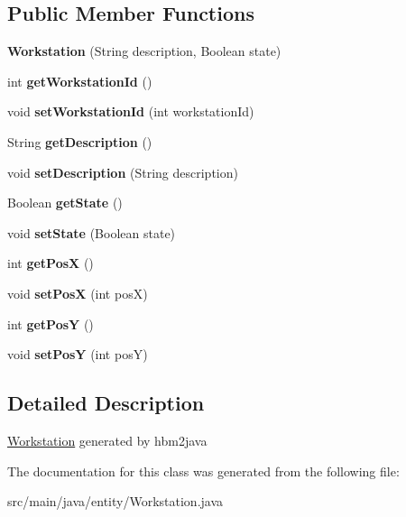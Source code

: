 \subsection*{Public Member Functions}
\begin{DoxyCompactItemize}
\item 
\mbox{\label{classentity_1_1_workstation_a7050f3be8e0ac1b55b66d9dd7d289a0a}} 
{\bfseries Workstation} (String description, Boolean state)
\item 
\mbox{\label{classentity_1_1_workstation_abb73425f42c9c651fdd58e06e9dd5e8b}} 
int {\bfseries get\+Workstation\+Id} ()
\item 
\mbox{\label{classentity_1_1_workstation_a34dbc056f3a0bfa3a94aebfc8a0f0d68}} 
void {\bfseries set\+Workstation\+Id} (int workstation\+Id)
\item 
\mbox{\label{classentity_1_1_workstation_ae79cd9019eb03d8526727c98ade26905}} 
String {\bfseries get\+Description} ()
\item 
\mbox{\label{classentity_1_1_workstation_ad164f196f2a925758dac0e9b9e28484b}} 
void {\bfseries set\+Description} (String description)
\item 
\mbox{\label{classentity_1_1_workstation_a49be3c2bef3d42a5596844c603712061}} 
Boolean {\bfseries get\+State} ()
\item 
\mbox{\label{classentity_1_1_workstation_a33d712bc34bd23dcf56492d3dd562635}} 
void {\bfseries set\+State} (Boolean state)
\item 
\mbox{\label{classentity_1_1_workstation_a43d6a5ccbe7769f8601c1ca0cd71ab93}} 
int {\bfseries get\+PosX} ()
\item 
\mbox{\label{classentity_1_1_workstation_a8cf2d5ff53a3904c985ad3cd7a8604a7}} 
void {\bfseries set\+PosX} (int posX)
\item 
\mbox{\label{classentity_1_1_workstation_a503cd702ed0e333b2a45460f9e4e8d1f}} 
int {\bfseries get\+PosY} ()
\item 
\mbox{\label{classentity_1_1_workstation_a94cb1fa4f96761a1b495b6f3fc8439da}} 
void {\bfseries set\+PosY} (int posY)
\end{DoxyCompactItemize}


\subsection{Detailed Description}
\mbox{\hyperlink{classentity_1_1_workstation}{Workstation}} generated by hbm2java 

The documentation for this class was generated from the following file\+:\begin{DoxyCompactItemize}
\item 
src/main/java/entity/Workstation.\+java\end{DoxyCompactItemize}
